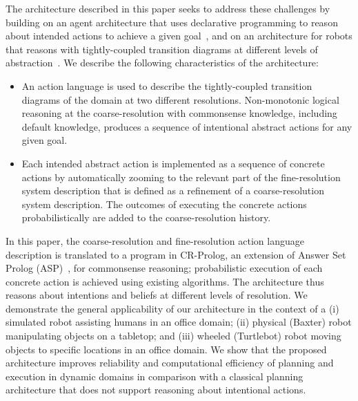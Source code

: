 \documentclass[letterpaper, 10 pt, conference]{ieeeconf}  %
\begin{document}

The architecture described in this paper seeks to address these
challenges by building on an agent architecture that uses declarative
programming to reason about intended actions to achieve a given
goal~\cite{blount2015theory}, and on an architecture for robots that
reasons with tightly-coupled transition diagrams at different levels
of abstraction~\cite{sridharan2017refinement}. We describe the
following characteristics of the architecture:
\begin{itemize}
\item An action language is used to describe the tightly-coupled
  transition diagrams of the domain at two different resolutions.
  Non-monotonic logical reasoning at the coarse-resolution with
  commonsense knowledge, including default knowledge, produces a
  sequence of intentional abstract actions for any given goal.

\item Each intended abstract action is implemented as a sequence of
  concrete actions by automatically zooming to the relevant part of
  the fine-resolution system description that is defined as a
  refinement of a coarse-resolution system description. The outcomes
  of executing the concrete actions probabilistically are added to the
  coarse-resolution history.
\end{itemize}
In this paper, the coarse-resolution and fine-resolution action
language description is translated to a program in CR-Prolog, an
extension of Answer Set Prolog (ASP)~\cite{gelfond2014knowledge}, for
commonsense reasoning; probabilistic execution of each concrete action
is achieved using existing algorithms. The architecture thus reasons
about intentions and beliefs at different levels of resolution. We
demonstrate the general applicability of our architecture in the
context of a (i) simulated robot assisting humans in an office domain;
(ii) physical (Baxter) robot manipulating objects on a tabletop; and
(iii) wheeled (Turtlebot) robot moving objects to specific locations
in an office domain. We show that the proposed architecture improves
reliability and computational efficiency of planning and execution in
dynamic domains in comparison with a classical planning architecture
that does not support reasoning about intentional actions.
\end{document}
